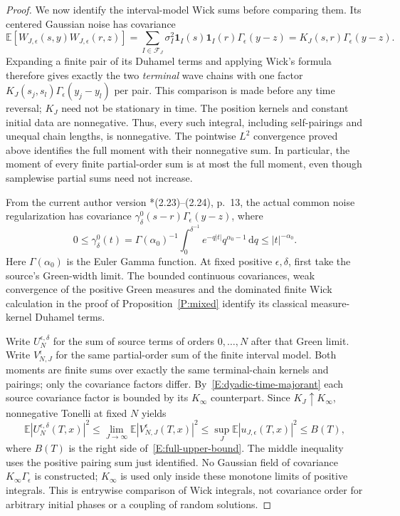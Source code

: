 \documentclass[12pt]{article}
\numberwithin{equation}{section}
\theoremstyle{definition}
\newcommand{\E}{\mathbb{E}}
\newcommand{\ud}{\,\mathrm{d}}
\begin{document}
\begin{proof}
  We now identify the interval-model Wick sums before comparing them.
  Its centered Gaussian noise has covariance
  \[
    \E[W_{J,\epsilon}(s,y)W_{J,\epsilon}(r,z)]
    =\sum_{I\in\mathcal F_J}\sigma_I^2
    \mathbf1_I(s)\mathbf1_I(r)\Gamma_\epsilon(y-z)
    =K_J(s,r)\Gamma_\epsilon(y-z).
  \]
  Expanding a finite pair of its Duhamel terms and applying Wick's formula
  therefore gives exactly the two \emph{terminal} wave chains with one
  factor $K_J(s_j,s_l)\Gamma_\epsilon(y_j-y_l)$ per pair.
  This comparison is made before any time reversal; $K_J$ need not be
  stationary in time. The position kernels and constant initial data
  are nonnegative. Thus, every such integral, including self-pairings
  and unequal chain lengths, is nonnegative. The pointwise $L^2$ convergence
  proved above identifies the full moment with their nonnegative sum.
  In particular, the moment of every finite partial-order sum is at most
  the full moment, even though samplewise partial sums need not increase.

  From the current author version
  \cite{chen:author2026:time-dependency}*{(2.23)--(2.24), p.~13},
  the actual common noise regularization has covariance
  $\gamma_\delta^0(s-r)\Gamma_\epsilon(y-z)$, where
  \[
    0\le\gamma_\delta^0(t)
    =\Gamma(\alpha_0)^{-1}\int_0^{\delta^{-1}}
    e^{-q|t|}q^{\alpha_0-1}\ud q
    \le |t|^{-\alpha_0}.
  \]
  Here $\Gamma(\alpha_0)$ is the Euler Gamma function.
  At fixed positive $\epsilon,\delta$, first take the source's Green-width
  limit. The bounded continuous covariances, weak convergence of the
  positive Green measures and the dominated finite Wick calculation in
  the proof of Proposition~\ref{P:mixed} identify its classical
  measure-kernel Duhamel terms.

  Write $U_N^{\epsilon,\delta}$ for the sum of source terms of orders
  $0,\ldots,N$ after that Green limit. Write $V_{N,J}^\epsilon$ for the
  same partial-order sum of the finite interval model. Both moments are
  finite sums over exactly the same terminal-chain kernels and pairings;
  only the covariance factors differ. By~\eqref{E:dyadic-time-majorant}
  each source covariance factor is bounded by its $K_\infty$ counterpart.
  Since $K_J\uparrow K_\infty$, nonnegative Tonelli at fixed $N$ yields
  \begin{equation}\label{E:interval-source-comparison}
    \E|U_N^{\epsilon,\delta}(T,x)|^2
    \le\lim_{J\to\infty}\E|V_{N,J}^\epsilon(T,x)|^2
    \le\sup_J\E|u_{J,\epsilon}(T,x)|^2\le B(T),
  \end{equation}
  where $B(T)$ is the right side of~\eqref{E:full-upper-bound}.
  The middle inequality uses the positive pairing sum just identified.
  No Gaussian field of covariance $K_\infty\Gamma_\epsilon$ is constructed;
  $K_\infty$ is used only inside these monotone limits of positive integrals.
  This is entrywise comparison of Wick integrals, not covariance order
  for arbitrary initial phases or a coupling of random solutions.


\end{proof}
\end{document}
